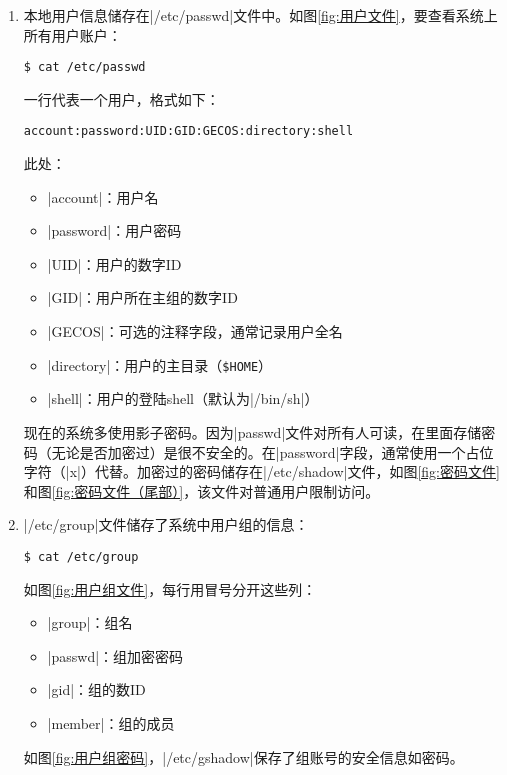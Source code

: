 \documentclass[cs4size,a4paper,nofonts]{ctexart}
\begin{document}
\begin{enumerate}

\item 本地用户信息储存在|/etc/passwd|文件中。如图\ref{fig:用户文件}，要查看系统上所有用户账户：
\begin{Verbatim}
$ cat /etc/passwd
\end{Verbatim}

一行代表一个用户，格式如下：
\begin{Verbatim}
account:password:UID:GID:GECOS:directory:shell
\end{Verbatim}

此处：
\begin{itemize}
\item |account|：用户名
\item |password|：用户密码
\item |UID|：用户的数字ID
\item |GID|：用户所在主组的数字ID
\item |GECOS|：可选的注释字段，通常记录用户全名
\item |directory|：用户的主目录（{\tt\$HOME}）
\item |shell|：用户的登陆shell（默认为|/bin/sh|）
\end{itemize}

现在的系统多使用影子密码。因为|passwd|文件对所有人可读，在里面存储密码（无论是否加密过）是很不安全的。在|password|字段，通常使用一个占位字符（|x|）代替。加密过的密码储存在|/etc/shadow|文件，如图\ref{fig:密码文件}和图\ref{fig:密码文件（尾部）}，该文件对普通用户限制访问。

\begin{figure}[htp]
\end{figure}

\item |/etc/group|文件储存了系统中用户组的信息：
\begin{Verbatim}
$ cat /etc/group
\end{Verbatim}

如图\ref{fig:用户组文件}，每行用冒号分开这些列：
\begin{itemize}
\item |group|：组名
\item |passwd|：组加密密码
\item |gid|：组的数ID
\item |member|：组的成员
\end{itemize}

如图\ref{fig:用户组密码}，|/etc/gshadow|保存了组账号的安全信息如密码。


\end{enumerate}
\end{document}
